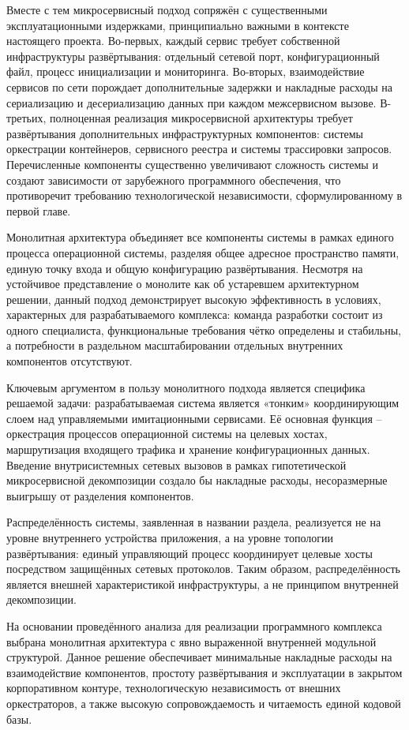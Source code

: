 Вместе с тем микросервисный подход сопряжён с существенными эксплуатационными издержками, принципиально важными в контексте настоящего проекта. Во-первых, каждый сервис требует собственной инфраструктуры развёртывания: отдельный сетевой порт, конфигурационный файл, процесс инициализации и мониторинга. Во-вторых, взаимодействие сервисов по сети порождает дополнительные задержки и накладные расходы на сериализацию и десериализацию данных при каждом межсервисном вызове. В-третьих, полноценная реализация микросервисной архитектуры требует развёртывания дополнительных инфраструктурных компонентов: системы оркестрации контейнеров, сервисного реестра и системы трассировки запросов. Перечисленные компоненты существенно увеличивают сложность системы и создают зависимости от зарубежного программного обеспечения, что противоречит требованию технологической независимости, сформулированному в первой главе.

Монолитная архитектура объединяет все компоненты системы в рамках единого процесса операционной системы, разделяя общее адресное пространство памяти, единую точку входа и общую конфигурацию развёртывания. Несмотря на устойчивое представление о монолите как об устаревшем архитектурном решении, данный подход демонстрирует высокую эффективность в условиях, характерных для разрабатываемого комплекса: команда разработки состоит из одного специалиста, функциональные требования чётко определены и стабильны, а потребности в раздельном масштабировании отдельных внутренних компонентов отсутствуют.

Ключевым аргументом в пользу монолитного подхода является специфика решаемой задачи: разрабатываемая система является «тонким» координирующим слоем над управляемыми имитационными сервисами. Её основная функция -- оркестрация процессов операционной системы на целевых хостах, маршрутизация входящего трафика и хранение конфигурационных данных. Введение внутрисистемных сетевых вызовов в рамках гипотетической микросервисной декомпозиции создало бы накладные расходы, несоразмерные выигрышу от разделения компонентов.

Распределённость системы, заявленная в названии раздела, реализуется не на уровне внутреннего устройства приложения, а на уровне топологии развёртывания: единый управляющий процесс координирует целевые хосты посредством защищённых сетевых протоколов. Таким образом, распределённость является внешней характеристикой инфраструктуры, а не принципом внутренней декомпозиции.

На основании проведённого анализа для реализации программного комплекса выбрана монолитная архитектура с явно выраженной внутренней модульной структурой. Данное решение обеспечивает минимальные накладные расходы на взаимодействие компонентов, простоту развёртывания и эксплуатации в закрытом корпоративном контуре, технологическую независимость от внешних оркестраторов, а также высокую сопровождаемость и читаемость единой кодовой базы.

